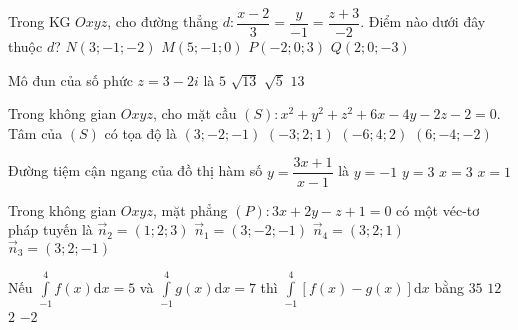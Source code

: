 \begin{ex}%
	Trong KG $Oxyz$, cho đường thẳng $d\colon \dfrac{x-2}{3}=\dfrac{y}{-1}=\dfrac{z+3}{-2}$. Điểm nào dưới đây thuộc $d$?	
	\choice
	{$N(3;-1;-2)$}
	{$M(5;-1;0)$}
	{$P(-2;0;3)$}
	{\True $Q(2;0;-3)$}
\end{ex}
\begin{ex}%
	Mô đun của số phức $z=3-2 i$ là	
	\choice
	{$5$}
	{\True $\sqrt{13}$}
	{$\sqrt{5}$}
	{$13$}
\end{ex}
\begin{ex}%
	Trong không gian $O x y z$, cho mặt cầu $(S)\colon x^2+y^2+z^2+6 x-4 y-2 z-2=0$. Tâm của $(S)$ có tọa độ là	
	\choice
	{$(3;-2;-1)$}
	{\True $(-3;2;1)$}
	{$(-6;4;2)$}
	{$(6;-4;-2)$}
\end{ex}
\begin{ex}%
	Đường tiệm cận ngang của đồ thị hàm số $y=\dfrac{3 x+1}{x-1}$ là	
	\choice
	{$y=-1$}
	{\True $y=3$}
	{$x=3$}
	{$x=1$}
\end{ex}
\begin{ex}%
	Trong không gian $O x y z$, mặt phẳng $(P)\colon 3 x+2 y-z+1=0$ có một véc-tơ pháp tuyến là
	\choice
	{$\overrightarrow{n}_2=(1 ; 2 ; 3)$}
	{$\overrightarrow{n}_1=(3;-2;-1)$}
	{$\overrightarrow{n}_4=(3;2;1)$}
	{\True $\overrightarrow{n}_3=(3;2;-1)$}
\end{ex}
\begin{ex}%
	Nếu $\displaystyle\int\limits_{-1}^4 f(x) \mathrm{d} x=5$ và $\displaystyle\int\limits_{-1}^4 g(x) \mathrm{d} x=7$ thì $\displaystyle\int\limits_{-1}^4[f(x)-g(x)] \mathrm{d} x$ bằng	
	\choice
	{$35$}
	{$12$}
	{$2$}
	{\True $-2$}
\end{ex}
